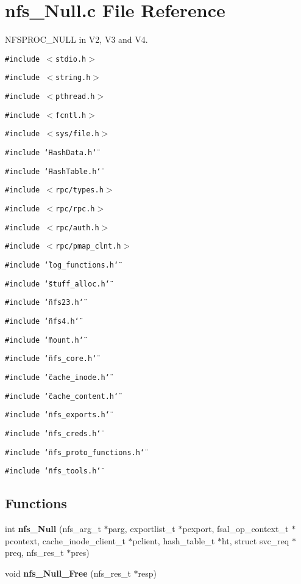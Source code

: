 \section{nfs\_\-Null.c File Reference}
\label{nfs__Null_8c}
NFSPROC\_\-NULL in V2, V3 and V4. 

{\tt \#include $<$stdio.h$>$}\par
{\tt \#include $<$string.h$>$}\par
{\tt \#include $<$pthread.h$>$}\par
{\tt \#include $<$fcntl.h$>$}\par
{\tt \#include $<$sys/file.h$>$}\par
{\tt \#include \char`\"{}Hash\-Data.h\char`\"{}}\par
{\tt \#include \char`\"{}Hash\-Table.h\char`\"{}}\par
{\tt \#include $<$rpc/types.h$>$}\par
{\tt \#include $<$rpc/rpc.h$>$}\par
{\tt \#include $<$rpc/auth.h$>$}\par
{\tt \#include $<$rpc/pmap\_\-clnt.h$>$}\par
{\tt \#include \char`\"{}log\_\-functions.h\char`\"{}}\par
{\tt \#include \char`\"{}stuff\_\-alloc.h\char`\"{}}\par
{\tt \#include \char`\"{}nfs23.h\char`\"{}}\par
{\tt \#include \char`\"{}nfs4.h\char`\"{}}\par
{\tt \#include \char`\"{}mount.h\char`\"{}}\par
{\tt \#include \char`\"{}nfs\_\-core.h\char`\"{}}\par
{\tt \#include \char`\"{}cache\_\-inode.h\char`\"{}}\par
{\tt \#include \char`\"{}cache\_\-content.h\char`\"{}}\par
{\tt \#include \char`\"{}nfs\_\-exports.h\char`\"{}}\par
{\tt \#include \char`\"{}nfs\_\-creds.h\char`\"{}}\par
{\tt \#include \char`\"{}nfs\_\-proto\_\-functions.h\char`\"{}}\par
{\tt \#include \char`\"{}nfs\_\-tools.h\char`\"{}}\par
\subsection*{Functions}
\begin{CompactItemize}
\item 
int {\bf nfs\_\-Null} (nfs\_\-arg\_\-t $\ast$parg, exportlist\_\-t $\ast$pexport, fsal\_\-op\_\-context\_\-t $\ast$pcontext, cache\_\-inode\_\-client\_\-t $\ast$pclient, hash\_\-table\_\-t $\ast$ht, struct svc\_\-req $\ast$preq, nfs\_\-res\_\-t $\ast$pres)
\item 
void {\bf nfs\_\-Null\_\-Free} (nfs\_\-res\_\-t $\ast$resp)
\end{CompactItemize}


